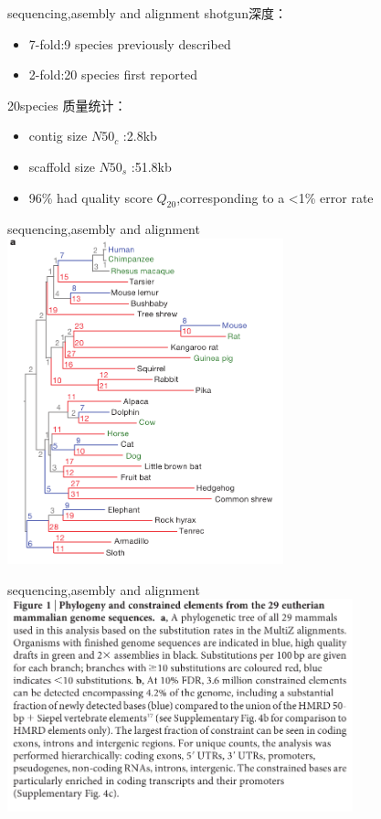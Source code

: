 \documentclass{beamer}
\begin{document}
\begin{frame}{sequencing,asembly and alignment}
shotgun深度：
\begin{itemize}
\item 7-fold:9  species previously described
\item 2-fold:20 species first reported
\end{itemize}
20species 质量统计：\\
\begin{itemize}
\item contig size $N50_c$ :2.8kb 
\item scaffold size $N50_s$ :51.8kb 
\item 96\% had quality score $Q_{20}$,corresponding to a <1\% error rate
\end{itemize}
\end{frame}

\begin{frame}{sequencing,asembly and alignment}
\includegraphics[width=8cm,angle=-90]{../clade.png}
\end{frame}

\begin{frame}{sequencing,asembly and alignment}
\includegraphics[width=10cm]{../clade_notes.png}
\end{frame}
\end{document}
